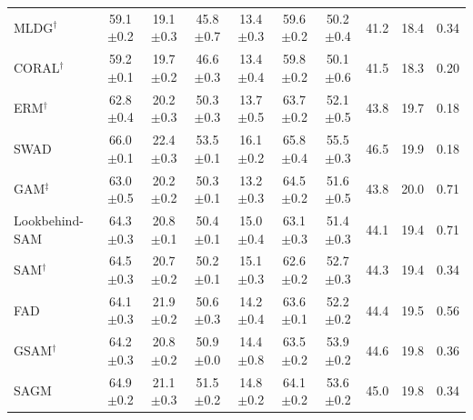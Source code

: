 \documentclass{article}
\theoremstyle{plain}
\theoremstyle{definition}
\theoremstyle{remark}
\begin{document}
\begin{table}[!ht]
\begin{tabular}{l|cccccc|ccc}
MLDG\(^\dag\) \cite{li2018mldg} & {59.1\scriptsize$\pm$0.2} & {19.1\scriptsize$\pm$0.3} & {45.8\scriptsize$\pm$0.7} & {13.4\scriptsize$\pm$0.3} & {59.6\scriptsize$\pm$0.2} & {50.2\scriptsize$\pm$0.4} & 41.2 & 18.4 & 0.34 \\
CORAL\(^\dag\) \cite{sun2016coral} & {59.2\scriptsize$\pm$0.1} & {19.7\scriptsize$\pm$0.2} & {46.6\scriptsize$\pm$0.3} & {13.4\scriptsize$\pm$0.4} & {59.8\scriptsize$\pm$0.2} & {50.1\scriptsize$\pm$0.6} & 41.5 & 18.3 & 0.20 \\
ERM\(^\dag\) & {62.8\scriptsize$\pm$0.4} & {20.2\scriptsize$\pm$0.3} & {50.3\scriptsize$\pm$0.3} & {13.7\scriptsize$\pm$0.5} & {63.7\scriptsize$\pm$0.2} & {52.1\scriptsize$\pm$0.5} & 43.8 & 19.7 & 0.18 \\
SWAD \cite{cha2021swad} & {66.0\scriptsize$\pm$0.1} & {22.4\scriptsize$\pm$0.3} & {53.5\scriptsize$\pm$0.1} & {16.1\scriptsize$\pm$0.2} & {65.8\scriptsize$\pm$0.4} & {55.5\scriptsize$\pm$0.3} & 46.5 & 19.9 & 0.18 \\ \midrule
GAM\(^\ddag\) \cite{zhang2023gam} & {63.0\scriptsize$\pm$0.5} & {20.2\scriptsize$\pm$0.2} & {50.3\scriptsize$\pm$0.1} & {13.2\scriptsize$\pm$0.3} & {64.5\scriptsize$\pm$0.2} & {51.6\scriptsize$\pm$0.5} & 43.8 & 20.0 & 0.71 \\
Lookbehind-SAM \cite{mordido2024lookbehind} & {64.3\scriptsize$\pm$0.3} & {20.8\scriptsize$\pm$0.1} & {50.4\scriptsize$\pm$0.1} & {15.0\scriptsize$\pm$0.4} & {63.1\scriptsize$\pm$0.3} & {51.4\scriptsize$\pm$0.3} & 44.1 & 19.4 & 0.71 \\
SAM\(^\dag\) \cite{foret2021sam} & {64.5\scriptsize$\pm$0.3} & {20.7\scriptsize$\pm$0.2} & {50.2\scriptsize$\pm$0.1} & {15.1\scriptsize$\pm$0.3} & {62.6\scriptsize$\pm$0.2} & {52.7\scriptsize$\pm$0.3} & 44.3 & 19.4 & 0.34 \\
FAD \cite{zhang2023fad} & {64.1\scriptsize$\pm$0.3} & {21.9\scriptsize$\pm$0.2} & {50.6\scriptsize$\pm$0.3} & {14.2\scriptsize$\pm$0.4} & {63.6\scriptsize$\pm$0.1} & {52.2\scriptsize$\pm$0.2} & 44.4 & 19.5 & 0.56 \\
GSAM\(^\dag\) \cite{zhuang2022gsam} & {64.2\scriptsize$\pm$0.3} & {20.8\scriptsize$\pm$0.2} & {50.9\scriptsize$\pm$0.0} & {14.4\scriptsize$\pm$0.8} & {63.5\scriptsize$\pm$0.2} & {53.9\scriptsize$\pm$0.2} & 44.6 & 19.8 & 0.36 \\
SAGM \cite{wang2023sagm} & {64.9\scriptsize$\pm$0.2} & {21.1\scriptsize$\pm$0.3} & {51.5\scriptsize$\pm$0.2} & {14.8\scriptsize$\pm$0.2} & {64.1\scriptsize$\pm$0.2} & {53.6\scriptsize$\pm$0.2} & 45.0 & 19.8 & 0.34 \\

\end{tabular}
\end{table}
\end{document}

